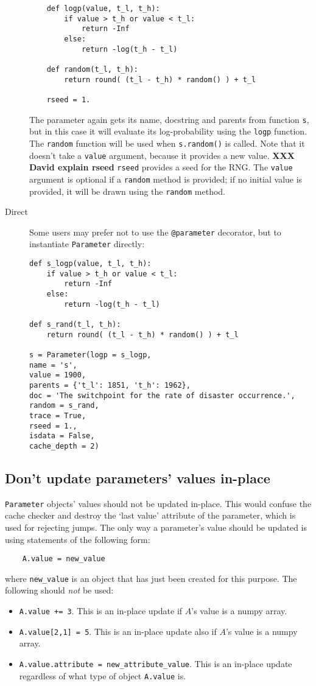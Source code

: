\begin{description}
\begin{verbatim}
    def logp(value, t_l, t_h):
        if value > t_h or value < t_l:
            return -Inf
        else:
            return -log(t_h - t_l) 
            
    def random(t_l, t_h):
        return round( (t_l - t_h) * random() ) + t_l

    rseed = 1.
    \end{verbatim}
The parameter again gets its name, docstring and parents from function \texttt{s}, but in this case it will evaluate its log-probability using the \texttt{logp} function. The \texttt{random} function will be used when \texttt{s.random()} is called. Note that it doesn't take a \texttt{value} argument, because it provides a new value. \textbf{XXX David explain rseed} \texttt{rseed} provides a seed for the RNG. The \texttt{value} argument is optional if a \texttt{random} method is provided; if no initial value is provided, it will be drawn using the \texttt{random} method.

    \item[Direct] Some users may prefer not to use the \texttt{@parameter} decorator, but to instantiate \texttt{Parameter} directly:
\begin{verbatim}
def s_logp(value, t_l, t_h):
    if value > t_h or value < t_l:
        return -Inf
    else:
        return -log(t_h - t_l) 

def s_rand(t_l, t_h):
    return round( (t_l - t_h) * random() ) + t_l

s = Parameter(logp = s_logp, 
name = 's', 
value = 1900,
parents = {'t_l': 1851, 't_h': 1962},
doc = 'The switchpoint for the rate of disaster occurrence.',
random = s_rand, 
trace = True, 
rseed = 1., 
isdata = False,
cache_depth = 2)
\end{verbatim}
\end{description}

\subsection{Don't update parameters' values in-place}

\texttt{Parameter} objects' values should not be updated in-place. This would confuse the cache checker and destroy the `last value' attribute of the parameter, which is used for rejecting jumps. The only way a parameter's value should be updated is using statements of the following form:
\begin{verbatim}
    A.value = new_value
\end{verbatim}
where \texttt{new\_value} is an object that has just been created for this purpose. The following should \emph{not} be used:
\begin{itemize}
    \item \texttt{A.value += 3}. This is an in-place update if $A$'s value is a numpy array.
    \item \texttt{A.value[2,1] = 5}. This is an in-place update also if $A$'s value is a numpy array.
    \item \texttt{A.value.attribute = new_attribute_value}. This is an in-place update regardless of what type of object \texttt{A.value} is.
\end{itemize}



